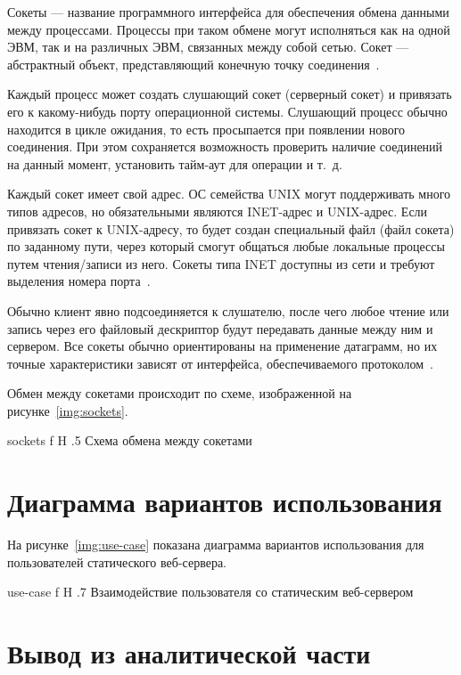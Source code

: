 \documentclass{bmstu}
\begin{document}
Сокеты --- название программного интерфейса для обеспечения обмена данными между процессами. 
Процессы при таком обмене могут исполняться как на одной ЭВМ, так и на различных ЭВМ, связанных между собой сетью. 
Сокет --- абстрактный объект, представляющий конечную точку соединения~\cite{Sockets2020}.

Каждый процесс может создать слушающий сокет (серверный сокет) и привязать его к какому-нибудь порту операционной системы. 
Слушающий процесс обычно находится в цикле ожидания, то есть просыпается при появлении нового соединения. 
При этом сохраняется возможность проверить наличие соединений на данный момент, установить тайм-аут для операции и т.~д.~\cite{Sockets2020}

Каждый сокет имеет свой адрес. 
ОС семейства UNIX могут поддерживать много типов адресов, но обязательными являются INET-адрес и UNIX-адрес. 
Если привязать сокет к UNIX-адресу, то будет создан специальный файл (файл сокета) по заданному пути, через который смогут общаться любые локальные процессы путем чтения/записи из него. 
Сокеты типа INET доступны из сети и требуют выделения номера порта~\cite{Sockets2020}.

Обычно клиент явно подсоединяется к слушателю, после чего любое чтение или запись через его файловый дескриптор будут передавать данные между ним и сервером. 
Все сокеты обычно ориентированы на применение датаграмм, но их точные характеристики зависят от интерфейса, обеспечиваемого протоколом~\cite{Sockets2020}. 

\pagebreak
Обмен между сокетами происходит по схеме, изображенной на рисунке~\ref{img:sockets}.

    {sockets}
    {f}
    {H}
    {.5\textwidth}
    {Схема обмена между сокетами~\cite{Sockets2020}}

\pagebreak
\section{Диаграмма вариантов использования}

На рисунке~\ref{img:use-case} показана диаграмма вариантов использования для пользователей статического веб-сервера.

    {use-case}
    {f}
    {H}
    {.7\textwidth}
    {Взаимодействие пользователя со статическим веб-сервером}

\section*{Вывод из аналитической части}
\end{document}
